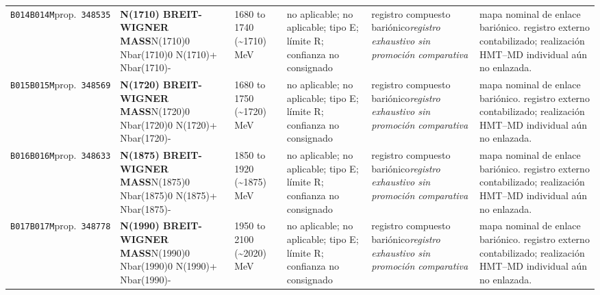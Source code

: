 \begin{landscape}
\begin{longtable}{L{1.85cm}L{4.45cm}L{2.35cm}L{4.05cm}L{3.35cm}L{7.15cm}}
\texttt{B014}\newline \texttt{B014M}\newline prop.\ \texttt{348535} & \textbf{N(1710) BREIT-WIGNER MASS}\newline N(1710)0 \textbar{}\allowbreak{} Nbar(1710)0 \textbar{}\allowbreak{} N(1710)+ \textbar{}\allowbreak{} Nbar(1710)- & 1680 to 1740 (\textasciitilde{}1710)\,MeV & no aplicable; no aplicable; tipo E; límite R; confianza no consignado & registro compuesto bariónico\newline \emph{registro exhaustivo sin promoción comparativa} & mapa nominal de enlace bariónico. registro externo contabilizado; realización HMT--MD individual aún no enlazada. \\
\texttt{B015}\newline \texttt{B015M}\newline prop.\ \texttt{348569} & \textbf{N(1720) BREIT-WIGNER MASS}\newline N(1720)0 \textbar{}\allowbreak{} Nbar(1720)0 \textbar{}\allowbreak{} N(1720)+ \textbar{}\allowbreak{} Nbar(1720)- & 1680 to 1750 (\textasciitilde{}1720)\,MeV & no aplicable; no aplicable; tipo E; límite R; confianza no consignado & registro compuesto bariónico\newline \emph{registro exhaustivo sin promoción comparativa} & mapa nominal de enlace bariónico. registro externo contabilizado; realización HMT--MD individual aún no enlazada. \\
\texttt{B016}\newline \texttt{B016M}\newline prop.\ \texttt{348633} & \textbf{N(1875) BREIT-WIGNER MASS}\newline N(1875)0 \textbar{}\allowbreak{} Nbar(1875)0 \textbar{}\allowbreak{} N(1875)+ \textbar{}\allowbreak{} Nbar(1875)- & 1850 to 1920 (\textasciitilde{}1875)\,MeV & no aplicable; no aplicable; tipo E; límite R; confianza no consignado & registro compuesto bariónico\newline \emph{registro exhaustivo sin promoción comparativa} & mapa nominal de enlace bariónico. registro externo contabilizado; realización HMT--MD individual aún no enlazada. \\
\texttt{B017}\newline \texttt{B017M}\newline prop.\ \texttt{348778} & \textbf{N(1990) BREIT-WIGNER MASS}\newline N(1990)0 \textbar{}\allowbreak{} Nbar(1990)0 \textbar{}\allowbreak{} N(1990)+ \textbar{}\allowbreak{} Nbar(1990)- & 1950 to 2100 (\textasciitilde{}2020)\,MeV & no aplicable; no aplicable; tipo E; límite R; confianza no consignado & registro compuesto bariónico\newline \emph{registro exhaustivo sin promoción comparativa} & mapa nominal de enlace bariónico. registro externo contabilizado; realización HMT--MD individual aún no enlazada. \\

\end{longtable}
\end{landscape}
